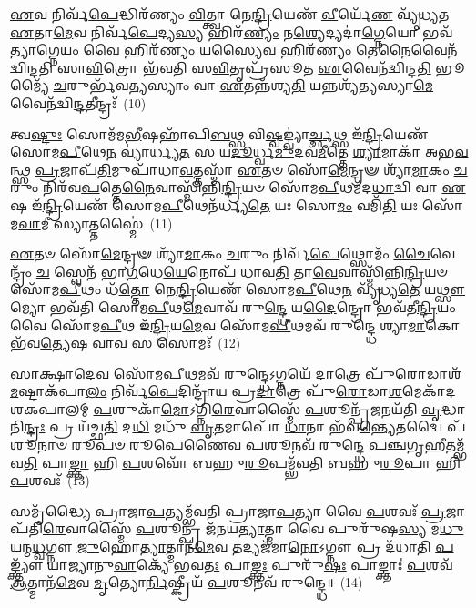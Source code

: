 \-\ul{𑌏}\-𑌵 𑌨𑌿𑌰𑍍𑌵᳴\-\ul{𑌪𑍇}\-𑌦𑍍𑌧𑌿𑌰᳴𑌣𑍍𑌯𑌂 \ul{𑌵𑌿}\-𑌤𑍍𑌤𑍍𑌵𑌾 𑌨𑍇\-\ul{𑌨𑍍𑌦𑍍𑌰𑌿}\-𑌯𑍇𑌣᳴ \ul{𑌵𑍀}\-𑌰𑍍𑌯𑍇᳴\-\ul{𑌣} 𑌵𑍍𑌯𑍃᳴𑌧𑍍𑌯𑌤 \ul{𑌏}\-𑌤𑌾\-\ul{𑌮𑍇}\-𑌵 𑌨𑌿𑌰𑍍𑌵᳴\-\ul{𑌪𑍇}\-𑌦𑍍𑌯\-\ul{𑌸𑍍𑌯} 𑌹𑌿𑌰᳴\-\ul{𑌣𑍍𑌯𑌂} 𑌨\-\ul{𑌶𑍍𑌯𑍇}\-𑌦𑍍𑌯𑌦𑌾॑\-\ul{𑌗𑍍𑌨𑍇}\-𑌯𑍋 𑌭𑌵᳴𑌤𑍍𑌯𑌾\-\ul{𑌗𑍍𑌨𑍇}\-𑌯𑌂 𑌵𑍈 𑌹𑌿𑌰᳴\-\ul{𑌣𑍍𑌯𑌂} 𑌯\-\ul{𑌸𑍍𑌯𑍈}\-𑌵 𑌹𑌿𑌰᳴\-\ul{𑌣𑍍𑌯𑌂} 𑌤𑍇\-\ul{𑌨𑍈}\-𑌵𑍈𑌨᳴𑌦𑍍𑌵𑌿𑌨𑍍𑌦𑌤𑌿 𑌸𑌾\-\ul{𑌵𑌿}\-𑌤𑍍𑌰𑍋 𑌭᳴𑌵𑌤𑌿 𑌸\-\ul{𑌵𑌿}\-𑌤𑍃𑌪𑍍𑌰᳴𑌸𑍂𑌤 \ul{𑌏}\-𑌵𑍈𑌨᳴𑌦𑍍𑌵𑌿𑌨𑍍𑌦\-\ul{𑌤𑌿} 𑌭𑍂𑌮𑍍𑌯𑍈᳴ \ul{𑌚}\-𑌰𑍁𑌰𑍍𑌭᳴𑌵\-\ul{𑌤𑍍𑌯}\-𑌸𑍍𑌯𑌾𑌂 𑌵𑌾 \ul{𑌏}\-𑌤𑌨𑍍𑌨᳴𑌶𑍍𑌯\-\ul{𑌤𑌿} 𑌯𑌨𑍍𑌨𑌶𑍍𑌯᳴\-\ul{𑌤𑍍𑌯}\-𑌸𑍍𑌯𑌾\-\ul{𑌮𑍇}\-𑌵𑍈𑌨᳴𑌦𑍍𑌵𑌿\-\ul{𑌨𑍍𑌦}\-𑌤𑍀𑌨𑍍𑌦𑍍𑌰𑌃᳴~(10)

𑌤𑍍𑌵\-\ul{𑌷𑍍𑌟𑍁𑌃} 𑌸𑍋𑌮᳴𑌮\-\ul{𑌭𑍀}\-𑌷𑌹𑌾᳴𑌪𑌿\-\ul{𑌬}\-𑌥𑍍𑌸 𑌵𑌿\-\ul{𑌷𑍍𑌵}\-𑌙𑍍𑌵𑍍𑌯𑌾॑\-\ul{𑌰𑍍𑌚𑍍𑌛}\-𑌥𑍍𑌸 𑌇᳴\-\ul{𑌨𑍍𑌦𑍍𑌰𑌿}\-𑌯𑍇𑌣᳴ 𑌸𑍋𑌮\-\ul{𑌪𑍀}\-𑌥𑍇\-\ul{𑌨} 𑌵𑍍𑌯𑌾॑𑌰𑍍𑌧𑍍𑌯\-\ul{𑌤} 𑌸 𑌯\-\ul{𑌦𑍂}\-𑌰𑍍𑌧𑍍𑌵\-\ul{𑌮𑍁}\-𑌦𑌵᳴\-\ul{𑌮𑍀}\-𑌤𑍍𑌤𑍇 \ul{𑌶𑍍𑌯𑌾}\-𑌮𑌾𑌕𑌾᳴ 𑌅𑌭\-\ul{𑌵}\-𑌨𑍍𑌥𑍍𑌸 \ul{𑌪𑍍𑌰}\-𑌜𑌾𑌪᳴\-\ul{𑌤𑌿}\-𑌮𑍁𑌪𑌾᳴𑌧𑌾\-\ul{𑌵}\-𑌤𑍍𑌤𑌸𑍍𑌮𑌾᳴ \ul{𑌏}\-𑌤𑍞 𑌸𑍋᳴\-\ul{𑌮𑍇}\-𑌨𑍍𑌦𑍍𑌰𑍟 𑌶𑍍𑌯𑌾᳴\-\ul{𑌮𑌾}\-𑌕𑌂 \ul{𑌚}\-𑌰𑍁𑌂 𑌨𑌿𑌰᳴𑌵\-\ul{𑌪}\-𑌤𑍍𑌤𑍇\-\ul{𑌨𑍈}\-𑌵𑌾𑌸𑍍𑌮𑌿᳴𑌨𑍍𑌨𑌿\-\ul{𑌨𑍍𑌦𑍍𑌰𑌿}\-𑌯𑍞 𑌸𑍋᳴𑌮\-\ul{𑌪𑍀}\-𑌥𑌮᳴𑌦\-\ul{𑌧𑌾}\-𑌦𑍍𑌵𑌿 𑌵𑌾 \ul{𑌏}\-𑌷 𑌇᳴\-\ul{𑌨𑍍𑌦𑍍𑌰𑌿}\-𑌯𑍇𑌣᳴ 𑌸𑍋𑌮\-\ul{𑌪𑍀}\-𑌥𑍇𑌨᳴𑌰𑍍𑌧𑍍𑌯\-\ul{𑌤𑍇} 𑌯𑌃 𑌸𑍋\-\ul{𑌮𑌂} 𑌵𑌮𑌿᳴\-\ul{𑌤𑌿} 𑌯𑌃 𑌸𑍋᳴𑌮\-\ul{𑌵𑌾}\-𑌮𑍀 𑌸𑍍𑌯𑌾𑌤𑍍𑌤𑌸𑍍𑌮𑍈॑~(11)

\-\ul{𑌏}\-𑌤𑍞 𑌸𑍋᳴\-\ul{𑌮𑍇}\-𑌨𑍍𑌦𑍍𑌰𑍟 𑌶𑍍𑌯𑌾᳴\-\ul{𑌮𑌾}\-𑌕𑌂 \ul{𑌚}\-𑌰𑍁𑌂 𑌨𑌿𑌰𑍍𑌵᳴\-\ul{𑌪𑍇}\-𑌥𑍍𑌸𑍋𑌮𑌂᳴ \ul{𑌚𑍈}\-𑌵𑍇𑌨𑍍𑌦𑍍𑌰𑌂᳴ \ul{𑌚} 𑌸𑍍𑌵𑍇𑌨᳴ 𑌭𑌾\-\ul{𑌗}\-𑌧𑍇\-\ul{𑌯𑍇}\-𑌨𑍋𑌪᳴ 𑌧𑌾𑌵\-\ul{𑌤𑌿} 𑌤𑌾\-\ul{𑌵𑍇}\-𑌵𑌾𑌸𑍍𑌮𑌿᳴𑌨𑍍𑌨𑌿\-\ul{𑌨𑍍𑌦𑍍𑌰𑌿}\-𑌯𑍞 𑌸𑍋᳴𑌮\-\ul{𑌪𑍀}\-𑌥𑌂 𑌧᳴\-\ul{𑌤𑍍𑌤𑍋} 𑌨𑍇\-\ul{𑌨𑍍𑌦𑍍𑌰𑌿}\-𑌯𑍇𑌣᳴ 𑌸𑍋𑌮\-\ul{𑌪𑍀}\-𑌥𑍇\-\ul{𑌨} 𑌵𑍍𑌯𑍃᳴𑌧𑍍𑌯\-\ul{𑌤𑍇} 𑌯\-\ul{𑌥𑍍𑌸𑍗}\-𑌮𑍍𑌯𑍋 𑌭𑌵᳴𑌤𑌿 𑌸𑍋𑌮\-\ul{𑌪𑍀}\-𑌥\-\ul{𑌮𑍇}\-𑌵𑌾𑌵᳴ 𑌰𑍁\-\ul{𑌨𑍍𑌦𑍍𑌧𑍇} 𑌯\-\ul{𑌦𑍈}\-𑌨𑍍𑌦𑍍𑌰𑍋 𑌭𑌵᳴𑌤𑍀\-\ul{𑌨𑍍𑌦𑍍𑌰𑌿}\-𑌯𑌂 𑌵𑍈 𑌸𑍋᳴𑌮\-\ul{𑌪𑍀}\-𑌥 𑌇᳴\-\ul{𑌨𑍍𑌦𑍍𑌰𑌿}\-𑌯\-\ul{𑌮𑍇}\-𑌵 𑌸𑍋᳴𑌮\-\ul{𑌪𑍀}\-𑌥𑌮𑌵᳴ 𑌰𑍁𑌨𑍍𑌦𑍍𑌧𑍇 𑌶𑍍𑌯𑌾\-\ul{𑌮𑌾}\-𑌕𑍋 𑌭᳴𑌵\-\ul{𑌤𑍍𑌯𑍇}\-𑌷 𑌵𑌾𑌵 𑌸 𑌸𑍋𑌮𑌃᳴~(12)

\-\ul{𑌸𑌾}\-𑌕𑍍𑌷𑌾\-\ul{𑌦𑍇}\-𑌵 𑌸𑍋᳴𑌮\-\ul{𑌪𑍀}\-𑌥𑌮𑌵᳴ 𑌰𑍁\-\ul{𑌨𑍍𑌦𑍍𑌧𑍇}\-\-𑌽𑌗𑍍𑌨𑌯𑍇᳴ \ul{𑌦𑌾}\-𑌤𑍍𑌰𑍇 𑌪𑍁᳴\-\ul{𑌰𑍋}\-𑌡𑌾𑌶᳴\-\ul{𑌮}\-𑌷𑍍𑌟𑌾\-𑌕᳴𑌪𑌾\-\ul{𑌲𑌂} 𑌨𑌿𑌰𑍍𑌵᳴\-\ul{𑌪𑍇}\-𑌦𑌿𑌨𑍍𑌦𑍍𑌰𑌾᳴𑌯 𑌪𑍍𑌰\-\ul{𑌦𑌾}\-𑌤𑍍𑌰𑍇 𑌪𑍁᳴\-\ul{𑌰𑍋}\-𑌡𑌾\-\ul{𑌶}\-𑌮𑍇𑌕𑌾᳴\-𑌦𑌶\-𑌕𑌪𑌾𑌲𑌮𑍍 \ul{𑌪}\-𑌶𑍁𑌕𑌾᳴\-\ul{𑌮𑍋}\-\-𑌽𑌗𑍍𑌨𑌿\-\ul{𑌰𑍇}\-𑌵𑌾𑌸𑍍𑌮𑍈᳴ \ul{𑌪}\-𑌶𑍂𑌨𑍍𑌪𑍍𑌰᳴\-\ul{𑌜}\-𑌨𑌯᳴𑌤𑌿 \ul{𑌵𑍃}\-𑌦𑍍𑌧𑌾𑌨𑌿\-\ul{𑌨𑍍𑌦𑍍𑌰𑌃} 𑌪𑍍𑌰 𑌯᳴𑌚𑍍𑌛\-\ul{𑌤𑌿} 𑌦\-\ul{𑌧𑌿} 𑌮𑌧𑍁᳴ \ul{𑌘𑍃}\-𑌤𑌮𑌾𑌪𑍋᳴ \ul{𑌧𑌾}\-𑌨𑌾 𑌭᳴𑌵\-\ul{𑌨𑍍𑌤𑍍𑌯𑍇}\-𑌤𑌦𑍍𑌵𑍈 𑌪᳴\-\ul{𑌶𑍂}\-𑌨𑌾𑍞 \ul{𑌰𑍂}\-𑌪𑍞 \ul{𑌰𑍂}\-𑌪𑍇\-\ul{𑌣𑍈}\-𑌵 \ul{𑌪}\-𑌶𑍂𑌨𑌵᳴ 𑌰𑍁𑌨𑍍𑌦𑍍𑌧𑍇 𑌪𑌞𑍍𑌚𑌗𑍃\-\ul{𑌹𑍀}\-𑌤𑌮𑍍𑌭᳴𑌵\-\ul{𑌤𑌿} 𑌪𑌾\-\ul{𑌙𑍍𑌕𑍍𑌤𑌾} 𑌹𑌿 \ul{𑌪}\-𑌶𑌵𑍋᳴ 𑌬𑌹𑍁\-\ul{𑌰𑍂}\-𑌪𑌮𑍍𑌭᳴𑌵𑌤𑌿 𑌬𑌹𑍁\-\ul{𑌰𑍂}\-𑌪𑌾 𑌹𑌿 \ul{𑌪}\-𑌶𑌵𑌃᳴~(13)

𑌸𑌮𑍃᳴𑌦𑍍𑌧𑍍𑌯𑍈 𑌪𑍍𑌰𑌾𑌜𑌾\-\ul{𑌪}\-𑌤𑍍𑌯𑌮𑍍𑌭᳴𑌵𑌤𑌿 𑌪𑍍𑌰𑌾𑌜𑌾\-\ul{𑌪}\-𑌤𑍍𑌯𑌾 𑌵𑍈 \ul{𑌪}\-𑌶𑌵𑌃᳴ \ul{𑌪𑍍𑌰}\-𑌜𑌾𑌪᳴𑌤𑌿\-\ul{𑌰𑍇}\-𑌵𑌾𑌸𑍍𑌮𑍈᳴ \ul{𑌪}\-𑌶𑍂𑌨𑍍𑌪𑍍𑌰 𑌜᳴𑌨𑌯\-\ul{𑌤𑍍𑌯𑌾}\-𑌤𑍍𑌮𑌾 𑌵𑍈 𑌪𑍁𑌰𑍁᳴𑌷\-\ul{𑌸𑍍𑌯} 𑌮\-\ul{𑌧𑍁} 𑌯𑌨𑍍𑌮\-\ul{𑌧𑍍𑌵}\-𑌗𑍍𑌨𑍗 \ul{𑌜𑍁}\-𑌹𑍋\-\ul{𑌤𑍍𑌯𑌾}\-𑌤𑍍𑌮𑌾𑌨᳴\-\ul{𑌮𑍇}\-𑌵 𑌤𑌦𑍍𑌯𑌜᳴𑌮𑌾\-\ul{𑌨𑍋}\-\-𑌽𑌗𑍍𑌨𑍗 𑌪𑍍𑌰 𑌦᳴𑌧𑌾𑌤𑌿 \ul{𑌪}\-𑌙𑍍𑌕𑍍𑌤𑍍𑌯𑍗᳴ 𑌯𑌾𑌜𑍍𑌯𑌾𑌨𑍁\-\ul{𑌵𑌾}\-𑌕𑍍𑌯𑍇᳴ 𑌭𑌵\-\ul{𑌤𑌃} 𑌪𑌾\-\ul{𑌙𑍍𑌕𑍍𑌤𑌃} 𑌪𑍁𑌰𑍁᳴\-\ul{𑌷𑌃} 𑌪𑌾𑌙𑍍𑌕𑍍𑌤𑌾𑌃॑ \ul{𑌪}\-𑌶𑌵᳴ \ul{𑌆}\-𑌤𑍍𑌮𑌾𑌨᳴\-\ul{𑌮𑍇}\-𑌵 \ul{𑌮𑍃}\-𑌤𑍍𑌯𑍋\-\ul{𑌰𑍍𑌨𑌿}\-𑌷𑍍𑌕𑍍𑌰𑍀𑌯᳴ \ul{𑌪}\-𑌶𑍂𑌨𑌵᳴ 𑌰𑍁𑌨𑍍𑌦𑍍𑌧𑍇॥~(14)

